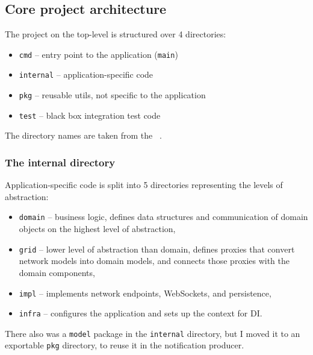 \subsection{Core project architecture}\label{sec:core-project-architecture}

The project on the top-level is structured over 4 directories:

\begin{itemize}
      \item
            \texttt{cmd} -- entry point to the application (\texttt{main})
      \item
            \texttt{internal} -- application-specific code
      \item
            \texttt{pkg} -- reusable utils, not specific to the application
      \item
            \texttt{test} -- black box integration test code
\end{itemize}

The directory names are taken
from the ~\cite{quest_standard_2022}.

\subsubsection{The internal directory}\label{sec:the-internal-directory}

Application-specific code is split into 5 directories
representing the levels of abstraction:

\begin{itemize}
      \item
            \texttt{domain} -- business logic,
            defines data structures and communication of domain objects
            on the highest level of abstraction,
      \item
            \texttt{grid} -- lower level of abstraction than domain,
            defines proxies that convert network models into domain models,
            and connects those proxies with the domain components,
      \item
            \texttt{impl} -- implements network endpoints,
            WebSockets, and persistence,
      \item
            \texttt{infra} -- configures the application
            and sets up the context for DI.
\end{itemize}

There also was a \texttt{model} package
in the \texttt{internal} directory,
but I moved it to an exportable \texttt{pkg} directory,
to reuse it in the notification producer.

